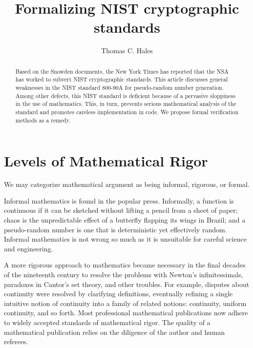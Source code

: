 \documentclass[11pt]{amsart} %
\begin{document}
\title{Formalizing NIST cryptographic standards}
\author{Thomas C. Hales} 
\maketitle


\begin{abstract} Based on the Snowden documents, the New York Times has reported that 
the NSA has worked to subvert NIST cryptographic standards.  
This article discusses general weaknesses in the NIST standard 800-90A for pseudo-random number
generation.
Among other defects, this NIST standard is deficient because of a pervasive sloppiness in the use of
mathematics.
This, in turn, prevents serious mathematical analysis of the standard and promotes careless implementation in code.
We propose formal verification methods as a remedy.
\end{abstract}

\section{Levels of Mathematical Rigor}

We may categorize mathematical argument as being
 informal,  rigorous, or formal.


Informal mathematics is found in the popular press.
Informally, a function is continuous if it can be sketched without lifting a pencil from a sheet of paper;
chaos is the unpredictable
effect of a butterfly flapping its wings in Brazil; and 
a pseudo-random number is one that is deterministic yet effectively random.
Informal mathematics is not wrong so much as it is unsuitable for careful science
and engineering.

 A more rigorous approach
to mathematics became necessary in the final decades of the nineteenth century  
to resolve the problems with Newton's infinitessimals,
paradoxes in Cantor's set theory, and other troubles.
For example, disputes about continuity were resolved by clarifying definitions,
eventually refining a single intuitive notion of continuity into a family of related notions: 
continuity, uniform continuity, 
and so forth.  Most professional mathematical publications now adhere to widely accepted 
standards of mathematical
rigor.  The quality of a mathematical publication relies on the diligence of the author and human referees.
\end{document}
